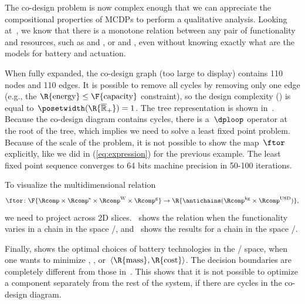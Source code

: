 The co-design problem is now complex enough that we can appreciate
the compositional properties of MCDPs to perform a qualitative analysis.
Looking at~, we know that there is a monotone relation
between any pair of functionality and resources, such as 
and , or  and , even without knowing
exactly what are the models for battery and actuation.

When fully expanded, the co-design graph (too large to display) contains
110 nodes and 110 edges. It is possible to remove all cycles by removing
only one edge (e.g., the $\R{\text{energy}}\leq\text{\F{\text{capacity}}}$
constraint), so the design complexity ()
is equal to~$\posetwidth(\R{\overline{\mathbb{R}}_{+}})=1$. The
tree representation is shown in~. Because the
co-design diagram contains cycles, there is a~$\dploop$ operator
at the root of the tree, which implies we need to solve a least fixed
point problem. Because of the scale of the problem, it is not possible
to show the map~$\ftor$ explicitly, like we did in (\ref{eq:expression})
for the previous example. The least fixed point sequence converges
to 64 bits machine precision in 50-100 iterations.

To visualize the multidimensional relation
\[
\ftor\colon\F{\Rcomp\times\Rcomp^{\text{s}}\times\Rcomp^{\text{W}}\times\Rcomp^{\text{g}}}\rightarrow\R{\antichains(\Rcomp^{\text{kg}}\times\Rcomp^{\text{USD}})},
\]
we need to project across 2D slices. ~shows
the relation when the functionality varies in a chain in the space
/, and~
shows the results for a chain in the space /.

Finally,  shows the optimal choices of battery
technologies in the / space, when one
wants to minimize , , or~$\left\langle \R{\text{mass}},\R{\text{cost}}\right\rangle $.
The decision boundaries are completely different from those in~.
This shows that it is not possible to optimize a component separately
from the rest of the system, if there are cycles in the co-design
diagram.

